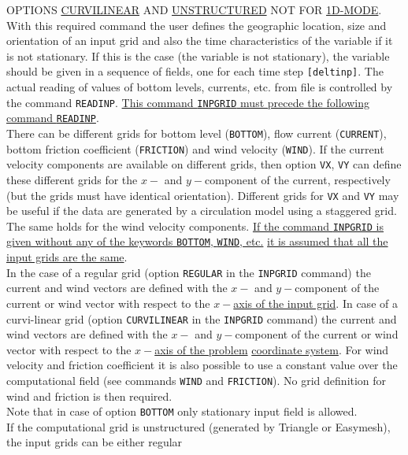 \documentclass[12pt]{book}
\begin{document}
\noindent
OPTIONS \underline{CURVILINEAR} AND \underline{UNSTRUCTURED} NOT FOR \underline{1D-MODE}.
\\[2ex]
\noindent
With this required command the user defines the geographic location, size and orientation of an input grid
and also the time characteristics of the variable if it is not stationary. If this is the case (the variable is not
stationary), the variable should be given in a sequence of fields, one for each time step {\tt [deltinp]}. The
actual reading of values of bottom levels, currents, etc. from file is controlled by the command {\tt READINP}.
\underline{This command {\tt INPGRID} must precede the following command {\tt READINP}}.
\\[2ex]
\noindent
There can be different grids for bottom level ({\tt BOTTOM}), flow current ({\tt CURRENT}), bottom friction coefficient
({\tt FRICTION}) and wind velocity ({\tt WIND}). If the current velocity components are available on different grids,
then option {\tt VX}, {\tt VY} can define these different grids for the $x-$ and $y-$component of the current, respectively
(but the grids must have identical orientation). Different grids for {\tt VX} and {\tt VY} may be useful if the data are
generated by a circulation model using a staggered grid. The same holds for the wind velocity
components. \underline{If the command {\tt INPGRID} is given without any of the keywords {\tt BOTTOM}, {\tt WIND}, etc.}
\underline{it is assumed that all the input grids are the same}.
\\[2ex]
\noindent
In the case of a regular grid (option {\tt REGULAR} in the {\tt INPGRID} command) the current and wind vectors
are defined with the $x-$ and $y-$component of the current or wind vector with respect to the \underline{$x-$axis of the input
grid}. In case of a curvi-linear grid (option {\tt CURVILINEAR} in the {\tt INPGRID} command) the current and wind
vectors are defined with the $x-$ and $y-$component of the current or wind vector with respect to the \underline{$x-$axis of
the problem} \underline{coordinate system}. For wind velocity and friction coefficient it is also possible to use a
constant value over the computational field (see commands {\tt WIND} and {\tt FRICTION}). No grid definition for
wind and friction is then required.
\\[2ex]
\noindent
Note that in case of option {\tt BOTTOM} only stationary input field is allowed.
\\[2ex]
\noindent
If the computational grid is unstructured (generated by Triangle or Easymesh), the input grids can be either regular
\end{document}
